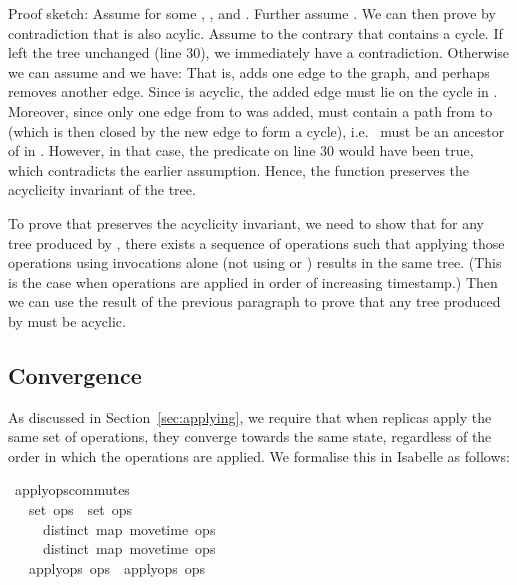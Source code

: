 \documentclass[sigconf]{acmart}
\renewenvironment{isabelle}{%
  \medbreak\noindent%
  \renewcommand{\isanewline}{\\}%
  \begin{minipage}{\columnwidth}%
  \begin{isabellebody}%
  \begin{tabbing}%
}{%
  \end{tabbing}%
  \end{isabellebody}%
  \end{minipage}%
  \medbreak%
}
\renewcommand{\isacartoucheopen}{}
\renewcommand{\isacartoucheclose}{}
\begin{document}
Proof sketch: Assume  for some , ,  and .
Further assume .
We can then prove by contradiction that  is also acylic.
Assume to the contrary that  contains a cycle.
If  left the tree unchanged (line 30), we immediately have a contradiction.
Otherwise we can assume  and we have:
\medbreak\noindent
{}
\medbreak\noindent
That is,  adds one edge  to the graph, and perhaps removes another edge.
Since  is acyclic, the added edge must lie on the cycle in .
Moreover, since only one edge from  to  was added,  must contain a path from  to  (which is then closed by the new edge to form a cycle), i.e.\  must be an ancestor of  in .
However, in that case, the predicate  on line 30 would have been true, which contradicts the earlier assumption.
Hence, the  function preserves the acyclicity invariant of the tree.

To prove that  preserves the acyclicity invariant, we need to show that for any tree produced by , there exists a sequence of operations such that applying those operations using  invocations alone (not using  or ) results in the same tree.
(This is the case when operations are applied in order of increasing timestamp.)
Then we can use the result of the previous paragraph to prove that any tree produced by  must be acyclic.

\subsection{Convergence}

As discussed in Section~\ref{sec:applying}, we require that when replicas apply the same set of operations, they converge towards the same state, regardless of the order in which the operations are applied.
We formalise this in Isabelle as follows:
\begin{isabelle}
\isamarkupfalse%
\ apply{\isacharunderscore}ops{\isacharunderscore}commutes{\isacharcolon}\isanewline
\ \ \ {\isacartoucheopen}set\ ops{}\ {\isacharequal}\ set\ ops{}{\isacartoucheclose}\isanewline
\ \ \ \ \ {\isacartoucheopen}distinct\ {\isacharparenleft}map\ move{\isacharunderscore}time\ ops{}{\isacharparenright}{\isacartoucheclose}\isanewline
\ \ \ \ \ {\isacartoucheopen}distinct\ {\isacharparenleft}map\ move{\isacharunderscore}time\ ops{}{\isacharparenright}{\isacartoucheclose}\isanewline
\ \ \ {\isacartoucheopen}apply{\isacharunderscore}ops\ ops{}\ {\isacharequal}\ apply{\isacharunderscore}ops\ ops{}{\isacartoucheclose}
\end{isabelle}
\end{document}
